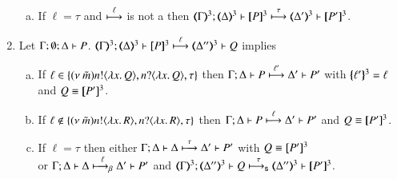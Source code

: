 \begin{proposition}
\begin{enumerate}
\begin{enumerate}[a)]
				\item	If $\ell = \tau$ and $\stackrel{\ell}{\longmapsto}$ is not a \betatran then
					$\horel{\tmap{\Gamma}{3}}{\tmap{\Delta}{3}}{\pmap{P}{3}}{\hby{\tau}}
					{\tmap{\Delta'}{3}}{\pmap{P'}{3}}$.
			\end{enumerate}

		\item	Let $\Gamma; \emptyset; \Delta \vdash P$.
			$\horel{\tmap{\Gamma}{3}}{\tmap{\Delta}{3}}{\pmap{P}{3}}{\hby{\ell}}
			{\tmap{\Delta''}{3}}{Q}$ implies
%
			\begin{enumerate}[a)]
				\item	If $\ell \in \{(\nu\ \tilde{m}) n ! \langle \lambda x.\,Q \rangle, n ? \langle \lambda x.\,Q \rangle, \tau\}$
					then
					$\Gamma; \Delta \vdash P \stackrel{\ell'}{\longmapsto} \Delta' \vdash P'$
					with $\{\!\!\{\ell'\}\!\!\}^{3} = \ell$ and $Q \equiv [\!\![P']\!\!]^{3}$.

				\item	If $\ell \notin \{(\nu\ \tilde{m}) n ! \langle \lambda x.\,R \rangle, n ? \langle \lambda x.\,R \rangle, \tau\}$
					then
					$\Gamma; \Delta \vdash P \stackrel{\ell}{\longmapsto} \Delta' \vdash P'$ and $Q \equiv [\!\![P']\!\!]^{3}$.

				\item	If $\ell = \tau$ then
					either
					$\Gamma; \Delta \vdash \Delta \stackrel{\tau}{\longmapsto} \Delta' \vdash P'$ with $Q \equiv [\!\![P']\!\!]^{3}$\\
					or
					$\Gamma; \Delta \vdash \Delta \stackrel{\ell}{\longmapsto_{\mathsf{\beta}}} \Delta' \vdash P'$ and
					$\horel{\tmap{\Gamma}{3}}{\tmap{\Delta''}{3}}{Q}{\shby{\tau}}
					{\tmap{\Delta''}{3}}{\pmap{P'}{3}}$.
			\end{enumerate}
	\end{enumerate}
\end{proposition}

